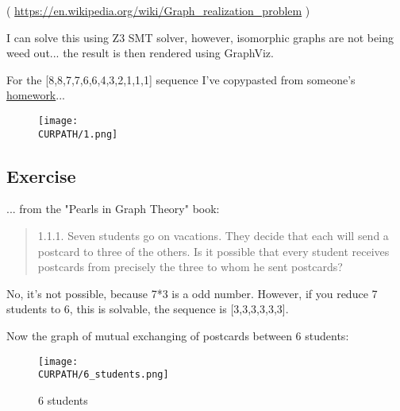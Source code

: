 ( \url{https://en.wikipedia.org/wiki/Graph_realization_problem} )

I can solve this using Z3 SMT solver, however, isomorphic graphs are not being weed out... the result is then rendered using GraphViz.



\clearpage
For the [8,8,7,7,6,6,4,3,2,1,1,1] sequence I've copypasted from someone's
\href{https://math.stackexchange.com/questions/1074651/check-if-sequence-is-graphic-8-8-7-7-6-6-4-3-2-1-1-1}{homework}...

\begin{figure}[H]
\centering
\texttt{[image: \\CURPATH/1.png]}
\end{figure}

\subsection{Exercise}

... from the "Pearls in Graph Theory" book:

\begin{framed}
\begin{quotation}
1.1.1. Seven students go on vacations. They decide that each will send a postcard to three of the others.
Is it possible that every student receives postcards from precisely the three to whom he sent postcards?
\end{quotation}
\end{framed}

No, it's not possible, because 7*3 is a odd number.
However, if you reduce 7 students to 6, this is solvable, the sequence is [3,3,3,3,3,3].

Now the graph of mutual exchanging of postcards between 6 students:

\begin{figure}[H]
\centering
\texttt{[image: \\CURPATH/6\_students.png]}
\caption{6 students}
\end{figure}

